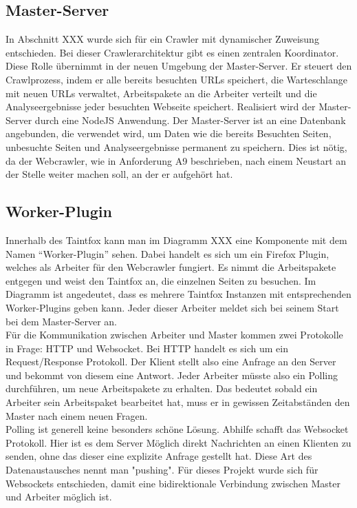 \subsection{Master-Server}
In Abschnitt XXX wurde sich für ein Crawler mit dynamischer Zuweisung entschieden. Bei dieser Crawlerarchitektur gibt es einen zentralen Koordinator. Diese Rolle übernimmt in der neuen Umgebung der Master-Server. Er steuert den Crawlprozess, indem er alle bereits besuchten URLs speichert, die Warteschlange mit neuen URLs verwaltet, Arbeitspakete an die Arbeiter verteilt und die Analyseergebnisse jeder besuchten Webseite speichert. Realisiert wird der Master-Server durch eine NodeJS Anwendung. Der Master-Server ist an eine Datenbank angebunden, die verwendet wird, um Daten wie die bereits Besuchten Seiten, unbesuchte Seiten und Analyseergebnisse permanent zu speichern. Dies ist nötig, da der Webcrawler, wie in Anforderung A9 beschrieben, nach einem Neustart an der Stelle weiter machen soll, an der er aufgehört hat.
\subsection{Worker-Plugin}
Innerhalb des Taintfox kann man im Diagramm XXX eine Komponente mit dem Namen \enquote{Worker-Plugin} sehen. Dabei handelt es sich um ein Firefox Plugin, welches als Arbeiter für den Webcrawler fungiert. Es nimmt die Arbeitspakete entgegen und weist den Taintfox an, die einzelnen Seiten zu besuchen. Im Diagramm ist angedeutet, dass es mehrere Taintfox Instanzen mit entsprechenden Worker-Plugins geben kann. Jeder dieser Arbeiter meldet sich bei seinem Start bei dem Master-Server an. \\
Für die Kommunikation zwischen Arbeiter und Master kommen zwei Protokolle in Frage: HTTP und Websocket. Bei HTTP handelt es sich um ein Request/Response Protokoll. Der Klient stellt also eine Anfrage an den Server und bekommt von diesem eine Antwort. Jeder Arbeiter müsste also ein Polling durchführen, um neue Arbeitspakete zu erhalten. Das bedeutet sobald ein Arbeiter sein Arbeitspaket bearbeitet hat, muss er in gewissen Zeitabständen den Master nach einem neuen Fragen. \\
Polling ist generell keine besonders schöne Lösung. Abhilfe schafft das Websocket Protokoll. Hier ist es dem Server Möglich direkt Nachrichten an einen Klienten zu senden, ohne das dieser eine explizite Anfrage gestellt hat. Diese Art des Datenaustausches nennt man "pushing". Für dieses Projekt wurde sich für Websockets entschieden, damit eine bidirektionale Verbindung zwischen Master und Arbeiter möglich ist.\\
